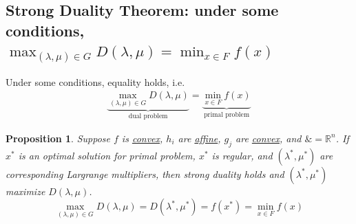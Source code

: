 \documentclass[11pt,a4paper]{article}
\newtheorem{proposition}{Proposition}
\begin{document}
\subsection{Strong Duality Theorem: under some conditions, $\max_{(\lambda,\mu)\in G}D(\lambda,\mu)= \min_{x\in F}f(x)$}
Under some conditions, equality holds, i.e.
\begin{equation}
    \begin{aligned}
        \underbrace{\max_{(\lambda,\mu)\in G}D(\lambda,\mu)}_{\text{dual problem}}=\underbrace{\min_{x\in F}f(x)}_{\text{primal problem}}
    \end{aligned}
    \nonumber
\end{equation}
\begin{proposition}
    Suppose $f$ is \underline{convex}, $h_i$ are \underline{affine}, $g_j$ are \underline{convex}, and \underline{$\&=\mathbb{R}^n$}. If $x^*$ is an optimal solution for primal problem, $x^*$ is regular, and $(\lambda^*,\mu^*)$ are corresponding Largrange multipliers, then strong duality holds and $(\lambda^*,\mu^*)$ maximize $D(\lambda,\mu)$. $$\max_{(\lambda,\mu)\in G}D(\lambda,\mu)=D(\lambda^*,\mu^*)=f(x^*)=\min_{x\in F}f(x)$$
\end{proposition}
\end{document}
